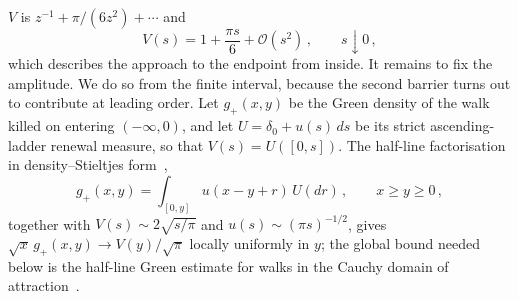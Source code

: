 \documentclass[11pt,a4paper]{article}
\theoremstyle{definition}
\begin{document}
$V$ is $z^{-1} + \pi/(6z^2) + \cdots$ and
\begin{equation}\label{eq.V-small-s}
  V(s) = 1 + \frac{\pi s}{6} + \mathcal O(s^2)\,,
  \qquad s \downarrow 0\,,
\end{equation}
which describes the approach to the endpoint from inside.
It remains to fix the amplitude.  We do so from the finite interval, because
the second barrier turns out to contribute at leading order.  Let $g_+(x,y)$ be the Green density
of the walk killed on entering $(-\infty,0)$, and let $U = \delta_0 + u(s)\,ds$
be its strict ascending-ladder renewal measure, so that $V(s) = U([0,s])$.  The
half-line factorisation in density--Stieltjes form~\cite{Spitzer1957},
\begin{equation}\label{eq.halfline-factorisation}
  g_+(x,y) = \int_{[0,y]}u(x-y+r)\,U(dr)\,,
  \qquad x \geq y \geq 0\,,
\end{equation}
together with $V(s) \sim 2\sqrt{s/\pi}$ and $u(s) \sim (\pi s)^{-1/2}$, gives
$\sqrt{x}\,g_+(x,y) \to V(y)/\sqrt{\pi}$ locally uniformly in $y$; the global
bound needed below is the half-line Green estimate for walks in the Cauchy
domain of attraction~\cite{DenisovWachtel2024}.
\end{document}
